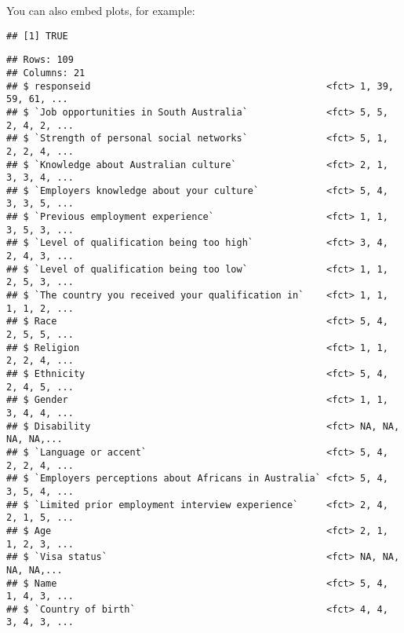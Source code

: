 \documentclass[
]{article}
\begin{document}
You can also embed plots, for example:

\begin{verbatim}
## [1] TRUE
\end{verbatim}

\begin{verbatim}
## Rows: 109
## Columns: 21
## $ responseid                                          <fct> 1, 39, 59, 61, ...
## $ `Job opportunities in South Australia`              <fct> 5, 5, 2, 4, 2, ...
## $ `Strength of personal social networks`              <fct> 5, 1, 2, 2, 4, ...
## $ `Knowledge about Australian culture`                <fct> 2, 1, 3, 3, 4, ...
## $ `Employers knowledge about your culture`            <fct> 5, 4, 3, 3, 5, ...
## $ `Previous employment experience`                    <fct> 1, 1, 3, 5, 3, ...
## $ `Level of qualification being too high`             <fct> 3, 4, 2, 4, 3, ...
## $ `Level of qualification being too low`              <fct> 1, 1, 2, 5, 3, ...
## $ `The country you received your qualification in`    <fct> 1, 1, 1, 1, 2, ...
## $ Race                                                <fct> 5, 4, 2, 5, 5, ...
## $ Religion                                            <fct> 1, 1, 2, 2, 4, ...
## $ Ethnicity                                           <fct> 5, 4, 2, 4, 5, ...
## $ Gender                                              <fct> 1, 1, 3, 4, 4, ...
## $ Disability                                          <fct> NA, NA, NA, NA,...
## $ `Language or accent`                                <fct> 5, 4, 2, 2, 4, ...
## $ `Employers perceptions about Africans in Australia` <fct> 5, 4, 3, 5, 4, ...
## $ `Limited prior employment interview experience`     <fct> 2, 4, 2, 1, 5, ...
## $ Age                                                 <fct> 2, 1, 1, 2, 3, ...
## $ `Visa status`                                       <fct> NA, NA, NA, NA,...
## $ Name                                                <fct> 5, 4, 1, 4, 3, ...
## $ `Country of birth`                                  <fct> 4, 4, 3, 4, 3, ...
\end{verbatim}
\end{document}

